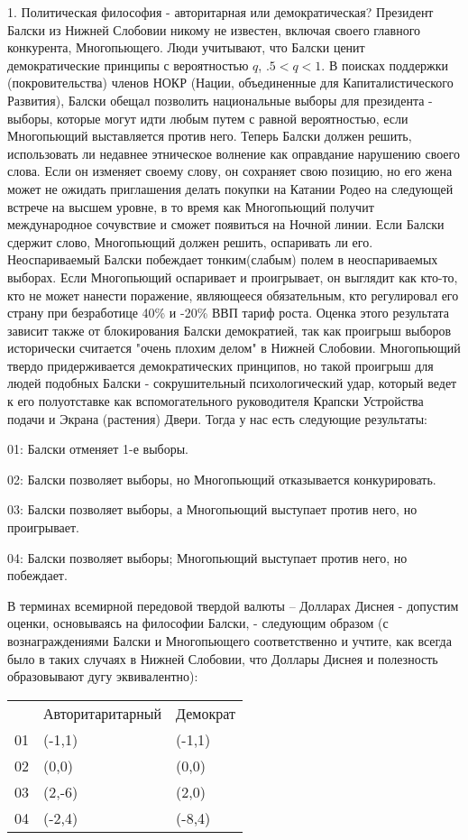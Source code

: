 \documentclass[a4paper,12pt]{article}
\begin{document}
1. Политическая философия - авторитарная или
демократическая? Президент Балски из Нижней
Слобовии никому не известен, включая своего
главного конкурента, Многопьющего. Люди учитывают,
что Балски ценит демократические принципы с
вероятностью $q$, $.5<q<1$. В поисках поддержки
(покровительства) членов НОКР (Нации, объединенные
для Капиталистического Развития), Балски обещал
позволить национальные выборы для президента -
выборы, которые могут идти любым путем с равной
вероятностью, если Многопьющий выставляется против
него. Теперь Балски должен решить, использовать ли
недавнее этническое волнение как оправдание
нарушению своего слова. Если он изменяет своему
слову, он сохраняет свою позицию, но его жена может
не ожидать приглашения делать покупки на Катании
Родео на следующей встрече на высшем уровне, в то
время как Многопьющий получит международное
сочувствие и сможет появиться на Ночной линии. Если
Балски сдержит слово, Многопьющий должен решить,
оспаривать ли его. Неоспариваемый Балски побеждает
тонким(слабым) полем в неоспариваемых выборах. Если
Многопьющий оспаривает и проигрывает, он выглядит
как кто-то, кто не может нанести поражение,
являющееся обязательным, кто регулировал его страну
при безработице 40\% и -20\% ВВП тариф роста.
Оценка этого результата зависит также от
блокирования Балски демократией, так как проигрыш
выборов исторически считается "очень плохим делом"
в Нижней Слобовии. Многопьющий твердо
придерживается демократических принципов, но такой
проигрыш для людей подобных Балски - сокрушительный
психологический удар, который ведет к его
полуотставке как вспомогательного руководителя
Крапски Устройства подачи и Экрана (растения)
Двери. Тогда у нас есть следующие результаты:

01: Балски отменяет 1-е выборы.

02: Балски позволяет выборы, но Многопьющий
отказывается конкурировать.

03: Балски позволяет выборы, а Многопьющий
выступает против него, но проигрывает.

04: Балски позволяет выборы; Многопьющий выступает
против него, но побеждает.

В терминах всемирной передовой твердой валюты --
Долларах Диснея - допустим оценки, основываясь на
философии Балски, - следующим образом (с
вознаграждениями Балски и Многопьющего
соответственно и учтите, как всегда было в таких
случаях в Нижней Слобовии, что Доллары Диснея и
полезность образовывают дугу эквивалентно):

\begin{tabular}{lll}
& Авторитаритарный & Демократ \\ \cline{2-3}
01 & \multicolumn{1}{|l}{(-1,1)} & \multicolumn{1}{|l|}{(-1,1)} \\
\cline{2-3} 02 & \multicolumn{1}{|l}{(0,0)} &
\multicolumn{1}{|l|}{(0,0)} \\ \cline{2-3} 03 &
\multicolumn{1}{|l}{(2,-6)} &
\multicolumn{1}{|l|}{(2,0)} \\ \cline{2-3}
04 & \multicolumn{1}{|l}{(-2,4)} & \multicolumn{1}{|l|}{(-8,4)} \\
\cline{2-3}
\end{tabular}
\end{document}
